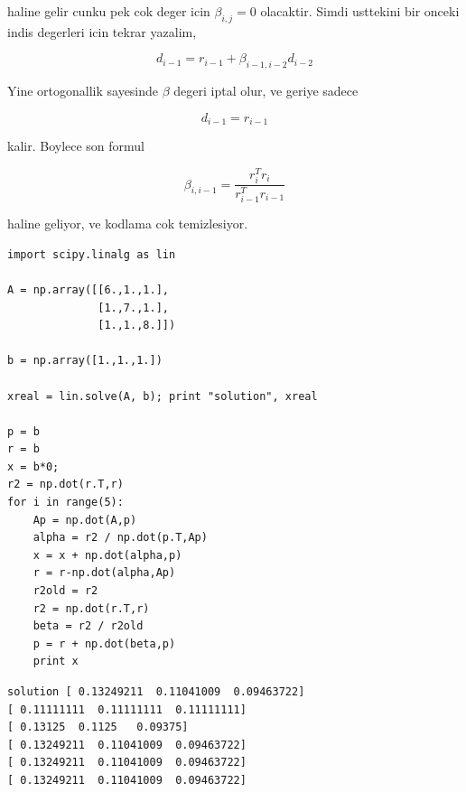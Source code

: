 \documentclass[12pt,fleqn]{article}\usepackage{../common}
\begin{document}
haline gelir cunku pek cok deger icin $\beta_{i,j} = 0$ olacaktir. Simdi
usttekini bir onceki indis degerleri icin tekrar yazalim,

\[ d_{i-1} = r_{i-1} + \beta_{i-1,i-2}d_{i-2} \]

Yine ortogonallik sayesinde $\beta$ degeri iptal olur, ve geriye sadece 

\[ d_{i-1} = r_{i-1} \]

kalir. Boylece son formul

\[ \beta_{i,i-1} = 
\frac{  r_i^Tr_i  }{r_{i-1}^Tr_{i-1}}
\]

haline geliyor, ve kodlama cok temizlesiyor. 

\begin{verbatim}
import scipy.linalg as lin

A = np.array([[6.,1.,1.],
              [1.,7.,1.],
              [1.,1.,8.]])

b = np.array([1.,1.,1.])

xreal = lin.solve(A, b); print "solution", xreal

p = b
r = b
x = b*0;
r2 = np.dot(r.T,r)
for i in range(5):
    Ap = np.dot(A,p)
    alpha = r2 / np.dot(p.T,Ap)
    x = x + np.dot(alpha,p)
    r = r-np.dot(alpha,Ap)
    r2old = r2
    r2 = np.dot(r.T,r)
    beta = r2 / r2old
    p = r + np.dot(beta,p)
    print x             
\end{verbatim}

\begin{verbatim}
solution [ 0.13249211  0.11041009  0.09463722]
[ 0.11111111  0.11111111  0.11111111]
[ 0.13125  0.1125   0.09375]
[ 0.13249211  0.11041009  0.09463722]
[ 0.13249211  0.11041009  0.09463722]
[ 0.13249211  0.11041009  0.09463722]
\end{verbatim}
\end{document}
